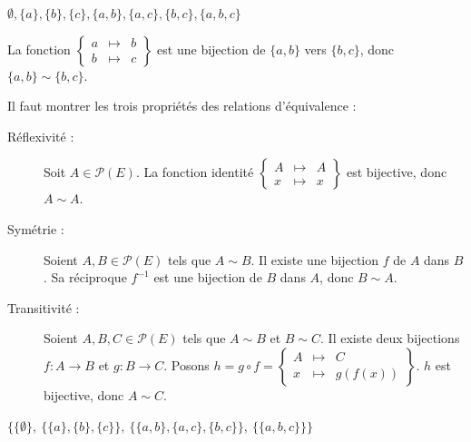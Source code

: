 \begin{corrections}

  \begin{questions}
  \item $\emptyset, \{a\}, \{b\}, \{c\}, \{a, b\}, \{a, c\}, \{b, c\}, \{a, b, c\}$
  \item La fonction $\left\{\begin{array}{rcl}
        a & \longmapsto & b\\
        b & \longmapsto & c
      \end{array}\right\}$ est une bijection de $\{a, b\}$ vers $\{b, c\}$, donc $\{a, b\} \sim \{b, c\}$.
  \item Il faut montrer les trois propriétés des relations d'équivalence :
    \begin{description}
    \item[Réflexivité :] Soit $A \in \mathscr{P}(E)$.  
      La fonction identité $\left\{\begin{array}{rcl}
        A & \longmapsto & A\\
        x & \longmapsto & x
      \end{array}\right\}$ est bijective, donc $A \sim A$.
    \item[Symétrie :] Soient $A, B \in \mathscr{P}(E)$ tels que $A \sim B$.  
      Il existe une bijection $f$ de $A$ dans $B$. Sa réciproque $f^{-1}$ est une bijection de $B$ dans $A$, donc $B \sim A$.
    \item[Transitivité :] Soient $A, B, C \in \mathscr{P}(E)$ tels que $A \sim B$ et $B \sim C$.  
      Il existe deux bijections $f : A \to B$ et $g : B \to C$.  
      Posons $h = g\circ f = \left\{\begin{array}{rcl}
        A & \longmapsto & C \\
        x & \longmapsto & g(f(x))
      \end{array}\right\}$.  
      $h$ est bijective, donc $A \sim C$.
    \end{description}
  \item $\big\{\{\emptyset\},\ \{\{a\}, \{b\}, \{c\}\},\ \{\{a, b\}, \{a, c\}, \{b, c\}\},\ \{\{a, b, c\}\}\big\}$
  \end{questions}

\end{corrections}

\endgroup
\endinput
